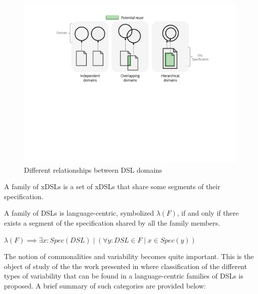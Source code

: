 \begin{figure}
\centering
\includegraphics[width=1\linewidth]{images/domains-fig.pdf}
\caption{Different relationships between DSL domains}
\label{fig:domains}
\end{figure}

A family of xDSLs is a set of xDSLs that share some segments of their specification. 

\begin{mydef} A family of DSLs is language-centric, symbolized $\lambda(F)$, if and only if there exists a segment of the specification shared by all the family members.
\vspace{-1mm}
\begin{center}
$\lambda(F) \implies \exists x : Spec(DSL) \mid (\forall y : DSL \in F \mid x \in Spec(y))$
\end{center}
\end{mydef}

The notion of commonalities and variability becomes quite important. This is the object of study of the the work presented in \cite{Cengarle:2009} where classification of the different types of variability that can be found in a language-centric families of DSLs is proposed. A brief summary of such categories are provided below:

